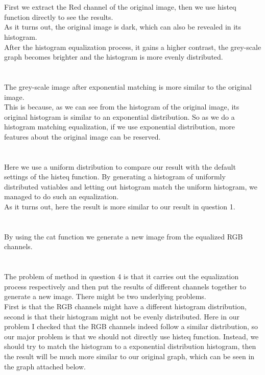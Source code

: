 \documentclass[12pt,letterpaper]{article}
\begin{document}
\section{}
First we extract the Red channel of the original image,
then we use histeq function directly to see the results.\\
As it turns out,
the original image is dark,
which can also be revealed in its histogram.\\
After the histogram equalization process, 
it gains a higher contrast,
the grey-scale graph becomes brighter
and the histogram is more evenly distributed.

\section{}
The grey-scale image after exponential matching is more similar to the 
original image.\\
This is because,
as we can see from the histogram of the original image,
its original histogram is similar to an exponential distribution.
So as we do a histogram matching equalization,
if we use exponential distribution,
more features about the original image can be reserved.

\section{}
Here we use a uniform distribution to compare our result 
with the default settings of the histeq function.
By generating a histogram of uniformly distributed vatiables 
and letting out histogram match the uniform histogram,
we managed to do such an equalization.\\
As it turns out,
here the result is more similar to our result in question 1.

\section{}
By using the cat function we generate a new image from the equalized RGB channels.

\section{}
The problem of method in question 4 is that it carries out 
the equalization process respectively and 
then put the results of different channels together to generate a new image.
There might be two underlying problems.\\
First is that the RGB channels might have a different histogram distribution,
second is that their histogram might not be evenly distributed.
Here in our problem I checked that the RGB channels indeed follow a similar distribution,
so our major problem is that we should not directly use histeq function.
Instead, we should try to match the histogram to a exponential distribution histogram,
then the result will be much more similar to our original graph, 
which can be seen in the graph attached below. 
\end{document}
